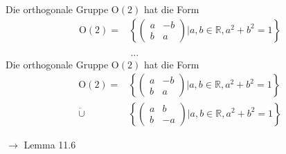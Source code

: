 \documentclass[11pt]{article}
\renewcommand{\cite}[1]{\par\bigskip\hfill{\color{gray}\tiny\(\to\) #1}}
\newcommand{\RR}{\mathbb{R}}
\let\olddots\dots
\renewcommand{\dots}{\,\olddots\,}
\newenvironment{field}{}{\newpage}
\newif\ifnote
\newenvironment{note}{\notetrue}{\notefalse}
\begin{document}
\begin{note}
    \begin{field}
        Die orthogonale Gruppe \(\text{O}(2)\) hat die Form
        \begin{align*}
            \text{O}(2) = &\left\{\left(\begin{smallmatrix}
                                  a & -b\\ b & a
                                \end{smallmatrix}\right) \vert a,b\in \RR, a^2+b^2=1\right\}\\
            \phantom{\dot\cup} &\dots
        \end{align*}
    \end{field}
    \begin{field}
        Die orthogonale Gruppe \(\text{O}(2)\) hat die Form
        \begin{align*}
            \text{O}(2) = &\left\{\left(\begin{smallmatrix}
                                  a & -b\\ b & a
                                \end{smallmatrix}\right) \vert a,b\in \RR, a^2+b^2=1\right\}\\
            \dot\cup &\left\{\left(\begin{smallmatrix}
                              a & b\\ b & -a
                          \end{smallmatrix}\right) \vert a,b\in \RR, a^2+b^2=1\right\}
        \end{align*}
        \cite{Lemma 11.6}
    \end{field}
\end{note}
\end{document}
